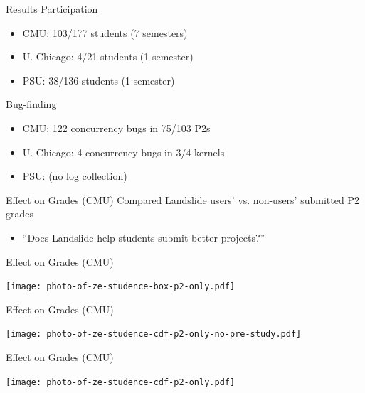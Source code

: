\documentclass[xcolor=dvipsnames]{beamer}
\begin{document}
\begin{frame}{Results}
	Participation
	\begin{itemize}
		\item CMU: 103/177 students (7 semesters)
		\item U. Chicago: 4/21 students (1 semester)
		\item PSU: 38/136 students (1 semester)
	\end{itemize}
	\linegap

	Bug-finding
	\begin{itemize}
		\item CMU: %
			122 concurrency bugs in 75/103 P2s
		\item U. Chicago: %
			4 concurrency bugs in 3/4 kernels
		\item PSU: (no log collection) %
	\end{itemize}
\end{frame}

\begin{frame}{Effect on Grades (CMU)}
	Compared Landslide users' vs. non-users' submitted P2 grades
	\begin{itemize}
		\item ``Does Landslide help students submit better projects?''
	\end{itemize}
	\linegap

\end{frame}

\begin{frame}{Effect on Grades (CMU)}
	\begin{center}
		\texttt{[image: photo-of-ze-studence-box-p2-only.pdf]}
	\end{center}
\end{frame}
\begin{frame}{Effect on Grades (CMU)} %
	\begin{center}
		\texttt{[image: photo-of-ze-studence-cdf-p2-only-no-pre-study.pdf]}
	\end{center}
\end{frame}
\begin{frame}{Effect on Grades (CMU)} %
	\begin{center}
		\texttt{[image: photo-of-ze-studence-cdf-p2-only.pdf]}
	\end{center}
\end{frame}
\end{document}

